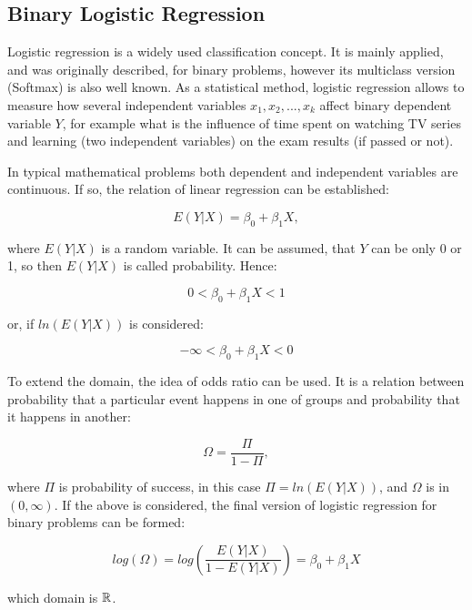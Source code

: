 \documentclass[energies,article,submit,pdftex,moreauthors]{Definitions/mdpi}
\begin{document}
\subsection{Binary Logistic Regression}
Logistic regression is a widely used classification concept. It is mainly applied, and was originally described, for binary problems, however its multiclass version (Softmax) is also well known. As a statistical method, logistic regression allows to measure how several independent variables $ x_1, x_2, ...,  x_k $ affect binary dependent variable $Y$, for example what is the influence of time spent on watching TV series and learning (two independent variables) on the exam results (if passed or not). 

In typical mathematical problems both dependent and independent variables are continuous. If so, the relation of linear regression can be established:
\begin{linenomath}
\begin{equation}
E(Y|X) = \beta_0 + \beta_1 X,
\end{equation}
\end{linenomath}
where $ E(Y|X) $ is a random variable. It can be assumed, that $ Y $ can be only 0 or 1, so then $ E(Y|X) $ is called probability. Hence:
\begin{linenomath}
\begin{equation}
0 < \beta_0 + \beta_1 X < 1
\end{equation}
\end{linenomath}
or, if $ ln(E(Y|X)) $ is considered:
\begin{linenomath}
\begin{equation}
-\infty < \beta_0 + \beta_1 X < 0
\end{equation}
\end{linenomath}
To extend the domain, the idea of odds ratio can be used. It is a relation between probability that a particular event happens in one of groups and probability that it happens in another:
\begin{linenomath}
\begin{equation}
\Omega = \frac{\Pi}{1-\Pi},
\end{equation}
\end{linenomath}
where $ \Pi $ is probability of success, in this case $ \Pi = ln(E(Y|X)) $, and $ \Omega $ is in $ (0, \infty)$. If the above is considered, the final version of logistic regression for binary problems can be formed:
\begin{linenomath}
\begin{equation}
log(\Omega) = log(\frac{E(Y|X)}{1 - E(Y|X)}) = \beta_0 + \beta_1 X
\end{equation}
\end{linenomath}
which domain is $ {\Bbb R} $.
\end{document}
